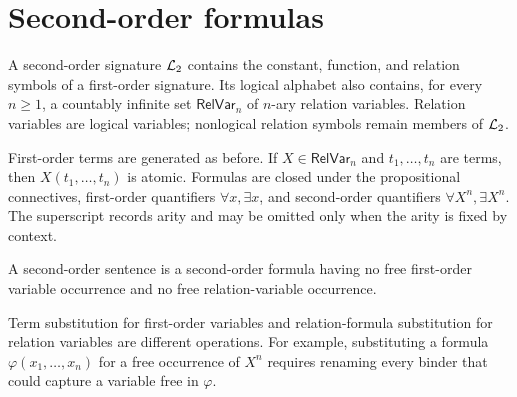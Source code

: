 \section{Second-order formulas}
\label{sec:second-order-logic-01}

\begin{definition}
A second-order signature \(\mathcal{L}_2\) contains the constant, function, and
relation symbols of a first-order signature.  Its logical alphabet also
contains, for every \(n\geq1\), a countably infinite set
\(\mathsf{RelVar}_n\) of \(n\)-ary relation variables.  Relation variables are
logical variables; nonlogical relation symbols remain members of \(\mathcal{L}_2\).
\end{definition}

First-order terms are generated as before.  If \(X\in\mathsf{RelVar}_n\) and
\(t_1,\ldots,t_n\) are terms, then \(X(t_1,\ldots,t_n)\) is atomic.  Formulas
are closed under the propositional connectives, first-order quantifiers
\(\forall x,\exists x\), and second-order quantifiers
\(\forall X^n,\exists X^n\).  The superscript records arity and may be omitted
only when the arity is fixed by context.

\begin{definition}
A second-order sentence is a second-order formula having no free first-order
variable occurrence and no free relation-variable occurrence.
\end{definition}

Term substitution for first-order variables and relation-formula substitution
for relation variables are different operations.  For example, substituting a
formula \(\varphi(x_1,\ldots,x_n)\) for a free occurrence of \(X^n\) requires
renaming every binder that could capture a variable free in \(\varphi\).

